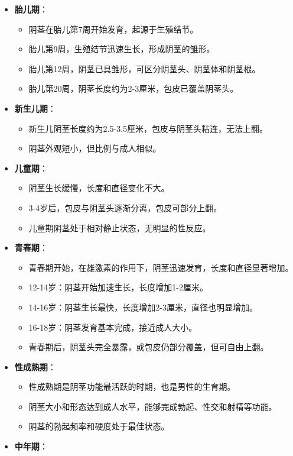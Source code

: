 \begin{itemize}
\item \textbf{胎儿期}：
  \begin{itemize}
  \item 阴茎在胎儿第7周开始发育，起源于生殖结节。
  \item 胎儿第9周，生殖结节迅速生长，形成阴茎的雏形。
  \item 胎儿第12周，阴茎已具雏形，可区分阴茎头、阴茎体和阴茎根。
  \item 胎儿第20周，阴茎长度约为2-3厘米，包皮已覆盖阴茎头。
  \end{itemize}
\item \textbf{新生儿期}：
  \begin{itemize}
  \item 新生儿阴茎长度约为2.5-3.5厘米，包皮与阴茎头粘连，无法上翻。
  \item 阴茎外观短小，但比例与成人相似。
  \end{itemize}
\item \textbf{儿童期}：
  \begin{itemize}
  \item 阴茎生长缓慢，长度和直径变化不大。
  \item 3-4岁后，包皮与阴茎头逐渐分离，包皮可部分上翻。
  \item 儿童期阴茎处于相对静止状态，无明显的性反应。
  \end{itemize}
\item \textbf{青春期}：
  \begin{itemize}
  \item 青春期开始，在雄激素的作用下，阴茎迅速发育，长度和直径显著增加。
  \item 12-14岁：阴茎开始加速生长，长度增加1-2厘米。
  \item 14-16岁：阴茎生长最快，长度增加2-3厘米，直径也明显增加。
  \item 16-18岁：阴茎发育基本完成，接近成人大小。
  \item 青春期后，阴茎头完全暴露，或包皮仍部分覆盖，但可自由上翻。
  \end{itemize}
\item \textbf{性成熟期}：
  \begin{itemize}
  \item 性成熟期是阴茎功能最活跃的时期，也是男性的生育期。
  \item 阴茎大小和形态达到成人水平，能够完成勃起、性交和射精等功能。
  \item 阴茎的勃起频率和硬度处于最佳状态。
  \end{itemize}
\item \textbf{中年期}：

\end{itemize}
